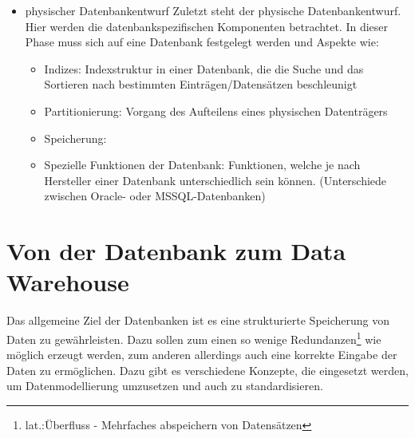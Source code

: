 \begin{itemize}
\begin{itemize}
				Beim systemunabhängigen Modellen wird mit festen Abbildungsregeln\footnote{Gewisse Regeln, die abhängig von gewissen unternehmerischen Faktoren sind} gearbeitet. Dies bedeutet, dass diese Modellierung abhängig vom verwendeten Modell ist. Daraus ergibt sich ein Datenbankmodell, welches nur auf eine Datenbank mit gleichem Modell übertragen werden kann.
			\item {Systemabhängig}  \newline
				Systemabhängige Datenmodelle verwenden spezifische Funktionen und Funktionalitäten einer Datenbank. Daraus ergeben sich ein oder mehrere sogenannte DDL-Skript\footnote{Data Definition Language - Sprache, zur Anlage und Löschung von Datenbanken\cite{Huckert:VL1_2}}. Diese Skripte sind in der Sprache der jeweiligen Datenbank geschrieben und ermöglichen eine bessere Protierung\footnote{(über-)tragen oder Transport} auf andere Datenbanken, die die gleich Sprache sprechen. \newline\cite{DatenbankenVerstehen:logischer_Datenbankentwurf}\cite{DatenbankenVerstehen:konzeptioneller_Datenbankentwurf}
		\end{itemize}
	Weiterhin wird hier festgelegt, welche Modellierungsart (Data Vault, ER-Diagramm (\autoref{fig:ER-Modell}), Star-Modellierung(\autoref{fig:Star-Schema}), etc. )genutzt wird. 
	\item {physischer Datenbankentwurf}\newline
	Zuletzt steht der physische Datenbankentwurf. Hier werden die datenbankspezifischen Komponenten betrachtet. In dieser Phase muss sich auf eine Datenbank festgelegt werden und Aspekte wie:
	\begin{itemize}
		\item {Indizes:} Indexstruktur in einer Datenbank, die die Suche und das Sortieren nach bestimmten Einträgen/Datensätzen beschleunigt\cite{Wikipedia:Datenbankindex}
		\item {Partitionierung:} Vorgang des Aufteilens eines physischen Datenträgers
		\item {Speicherung:} 
		\item {Spezielle Funktionen der Datenbank:} Funktionen, welche je nach Hersteller einer Datenbank unterschiedlich sein können. (Unterschiede zwischen Oracle- oder MSSQL-Datenbanken)
	\end{itemize}
	\cite{ITEW:Patrik_02.05}\cite{DatenbankenVerstehen:Physischer_Datenbankentwurf}
\end{itemize} 
\section{Von der Datenbank zum Data Warehouse}
Das allgemeine Ziel der Datenbanken ist es eine strukturierte Speicherung von Daten zu gewährleisten. Dazu sollen zum einen so wenige Redundanzen\footnote{lat.:Überfluss - Mehrfaches abspeichern von Datensätzen} wie möglich erzeugt werden, zum anderen allerdings auch eine korrekte Eingabe der Daten zu ermöglichen. Dazu gibt es verschiedene Konzepte, die eingesetzt werden, um Datenmodellierung umzusetzen und auch zu standardisieren.
